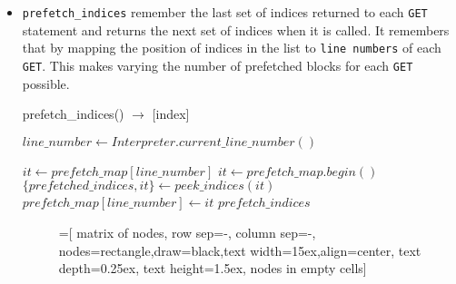 \begin{itemize}
\item \texttt{prefetch\_indices} remember the last set of indices returned to each
  \texttt{GET} statement and returns the next set of indices when it is called. It remembers
  that by mapping the position of indices in the list to \texttt{line numbers} of each
  \texttt{GET}. This makes varying the number of prefetched blocks for each
  \texttt{GET} possible.

  \begin{algorithm} {prefetch\_indices() $\rightarrow$ [index]}
    \singlespacing

    \begin{algorithmic}[1]
      \State $line\_number \gets Interpreter.current\_line\_number()$

      \State $it \gets prefetch\_map[line\_number]$
      \Else
      \State $it \gets prefetch\_map.begin()$
      \EndIf
      \State $\{prefetched\_indices, it\} \gets peek\_indices(it)$
      \State $prefetch\_map[line\_number] \gets it$
      \State \Return $prefetch\_indices$
      \EndFunction
    \end{algorithmic}
  \end{algorithm}

  \begin{figure}[h] %
    \centering

    =[
    matrix of nodes,
    row sep=-\pgflinewidth,
    column sep=-\pgflinewidth,
    nodes={rectangle,draw=black,text width=15ex,align=center},
    text depth=0.25ex,
    text height=1.5ex,
    nodes in empty cells]
\end{figure}
\end{itemize}
